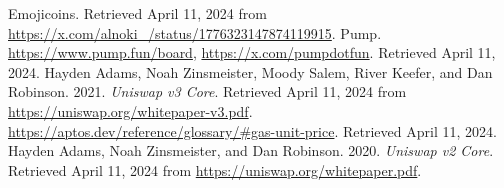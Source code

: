 \documentclass[table, twocolumn]{article}
\begin{document}
\begin{thebibliography}{}
   Emojicoins. Retrieved April 11, 2024 from
  \url{https://x.com/alnoki_/status/1776323147874119915}.
   Pump. \url{https://www.pump.fun/board}, \url{https://x.com/pumpdotfun}.
  Retrieved April 11, 2024.
   Hayden Adams, Noah Zinsmeister, Moody Salem, River Keefer, and Dan
  Robinson. 2021. \emph{Uniswap v3 Core}. Retrieved April 11, 2024 from
  \url{https://uniswap.org/whitepaper-v3.pdf}.
   \url{https://aptos.dev/reference/glossary/#gas-unit-price}. Retrieved
  April 11, 2024.
   Hayden Adams, Noah Zinsmeister, and Dan Robinson. 2020. \emph{Uniswap
    v2 Core}. Retrieved April 11, 2024 from \url{https://uniswap.org/whitepaper.pdf}.
\end{thebibliography}
\end{document}
